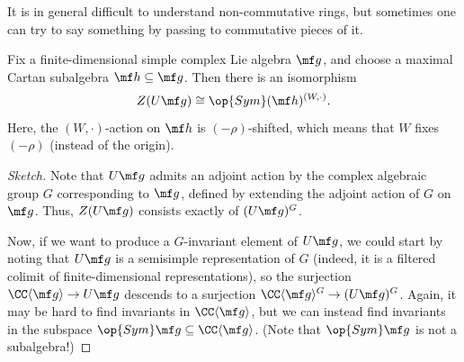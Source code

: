 \documentclass[../notes.tex]{subfiles}
\begin{document}
It is in general difficult to understand non-commutative rings, but sometimes one can try to say something by passing to commutative pieces of it.
\begin{theorem}
	Fix a finite-dimensional simple complex Lie algebra $\mf g$, and choose a maximal Cartan subalgebra $\mf h\subseteq\mf g$. Then there is an isomorphism
	\[Z(U\mf g)\cong\op{Sym}(\mf h)^{(W,\cdot)}.\]
	Here, the $(W,\cdot)$-action on $\mf h$ is $(-\rho)$-shifted, which means that $W$ fixes $(-\rho)$ (instead of the origin).
\end{theorem}
\begin{proof}[Sketch]
	Note that $U\mf g$ admits an adjoint action by the complex algebraic group $G$ corresponding to $\mf g$, defined by extending the adjoint action of $G$ on $\mf g$. Thus, $Z(U\mf g)$ consists exactly of $(U\mf g)^G$.
	
	Now, if we want to produce a $G$-invariant element of $U\mf g$, we could start by noting that $U\mf g$ is a semisimple representation of $G$ (indeed, it is a filtered colimit of finite-dimensional representations), so the surjection $\CC\langle\mf g\rangle\to U\mf g$ descends to a surjection $\CC\langle\mf g\rangle^G\to(U\mf g)^G$. Again, it may be hard to find invariants in $\CC\langle\mf g\rangle$, but we can instead find invariants in the subspace $\op{Sym}\mf g\subseteq\CC\langle\mf g\rangle$. (Note that $\op{Sym}\mf g$ is not a subalgebra!)


\end{proof}
\end{document}
